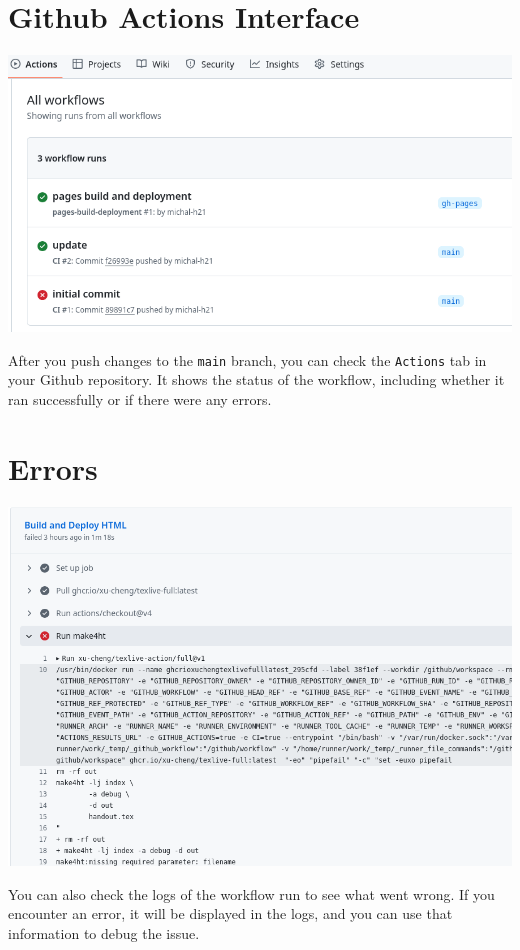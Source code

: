 \documentclass{book}
\begin{document}
\section{Github Actions Interface}
\includegraphics[width=\textwidth]{img/github-actions.png}

After you push changes to the \texttt{main} branch, you can check the \texttt{Actions} tab in your
Github repository. It shows the status of the workflow, including whether it ran successfully or if there were any errors.


\section{Errors}
\includegraphics[width=\textwidth]{img/github-error.png}


You can also check the logs of the workflow run to see what went wrong.
If you encounter an error, it will be displayed in the logs, and you can use that
information to debug the issue.
\end{document}
